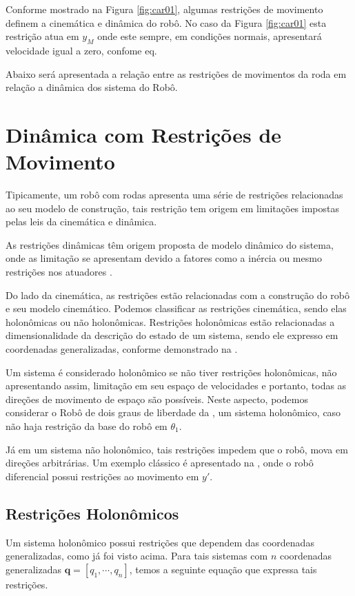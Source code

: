 Conforme mostrado na Figura \ref{fig:car01}, algumas restrições de movimento definem a cinemática e dinâmica do robô. No caso da Figura  \ref{fig:car01} esta restrição atua em $y_M$ onde este sempre, em condições normais, apresentará velocidade igual a zero, confome eq.

Abaixo será apresentada a relação entre as restrições de movimentos da roda em relação a dinâmica dos sistema do Robô.

\section{Dinâmica com Restrições de Movimento}

Tipicamente, um robô com rodas apresenta uma série de restrições relacionadas ao seu modelo de construção, tais restrição tem origem em limitações impostas pelas leis da cinemática e dinâmica.

As restrições dinâmicas têm origem proposta de modelo dinâmico do sistema, onde as limitação se apresentam devido a fatores como a inércia ou mesmo restrições nos atuadores \cite{klancar2017wheeled}.

Do lado da cinemática, as restrições estão relacionadas com a construção do robô e seu modelo cinemático. Podemos classificar as restrições cinemática, sendo elas holonômicas ou não holonômicas. Restrições holonômicas estão relacionadas a dimensionalidade da descrição do estado de um sistema, sendo ele expresso em coordenadas generalizadas, conforme demonstrado na .

Um sistema é considerado holonômico se não tiver restrições holonômicas, não apresentando assim, limitação em seu espaço de velocidades e portanto, todas as direções de movimento de espaço são possíveis. Neste aspecto, podemos considerar o Robô de dois graus de liberdade da , um sistema holonômico, caso não haja restrição da base do robô em $\theta_1$.

Já em um sistema não holonômico, tais restrições impedem que o robô, mova em direções arbitrárias. Um exemplo clássico é apresentado na  , onde o robô diferencial possui restrições ao movimento em $y'$.


\subsection{Restrições Holonômicos}
 Um sistema holonômico possui restrições que dependem das coordenadas generalizadas, como já foi visto acima. Para tais sistemas com $n$ coordenadas generalizadas $\mathbf{q} = [q_1, \cdots, q_n]$, temos a seguinte equação que expressa tais restrições.

